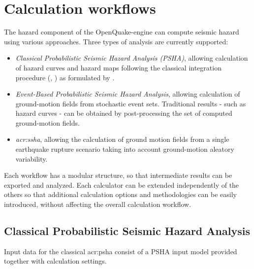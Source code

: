\section{Calculation workflows}
The hazard component of the OpenQuake-engine can compute seismic hazard 
using various approaches. 
%
Three types of analysis are currently supported:
\begin{itemize}
\item \textit{Classical Probabilistic Seismic Hazard Analysis (PSHA)}, 
allowing calculation of hazard curves and hazard maps following the 
classical integration procedure 
(\cite{cornell1968}, \citet{mcguire1976}) as formulated by \cite{field2003}.
%
\item \textit{Event-Based Probabilistic Seismic Hazard Analysis}, 
    allowing calculation of ground-motion fields from 
    stochastic event sets. Traditional results - 
    such as hazard curves - can be obtained by post-processing the 
    set of computed ground-motion fields.
\item \textit{\gls{acr:ssha}}, allowing the calculation of 
    ground motion fields from a single earthquake rupture scenario 
    taking into account ground-motion aleatory variability.
\end{itemize}
%
Each workflow has a modular structure, so that intermediate results 
can be exported and analyzed. 
Each calculator can be extended independently of the others so that 
additional calculation options and methodologies can be easily 
introduced, without affecting the overall calculation workflow. 
%
\subsection{Classical Probabilistic Seismic Hazard Analysis}
\label{section:classicalPSHA}
%
Input data for the classical \gls{acr:psha} consist of a PSHA input model
provided together with calculation settings. 

